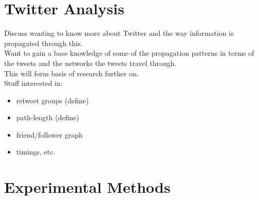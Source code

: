 \section{Twitter Analysis}
Discuss wanting to know more about Twitter and the way information is propagated through this. \\
Want to gain a base knowledge of some of the propagation patterns in terms of the tweets and the networks the tweets travel through. \\
This will form basis of research further on. \\ 
Stuff interested in:
\begin{itemize}
\item retweet groups (define)
\item path-length (define)
\item friend/follower graph 
\item timings, etc.
\end{itemize}

\section{Experimental Methods}
\label{experimental methods}
